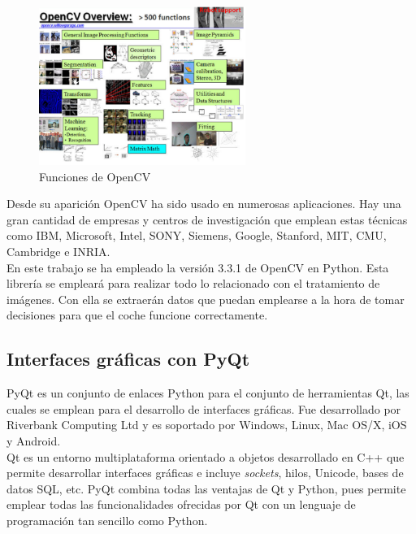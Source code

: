 \begin{figure}[H]
  \begin{center}
    \includegraphics[width=0.6\textwidth]{figures/Estado_arte/opencv.png}
		\caption{Funciones de OpenCV}
		\label{fig.opencv}
		\end{center}
\end{figure}


Desde su aparición OpenCV ha sido usado en numerosas aplicaciones. Hay una gran cantidad de empresas y centros de investigación que emplean estas técnicas como IBM, Microsoft, Intel, SONY, Siemens, Google, Stanford, MIT, CMU, Cambridge e INRIA.\\

En este trabajo se ha empleado la versión 3.3.1 de OpenCV en Python. Esta librería se empleará para realizar todo lo relacionado con el tratamiento de imágenes. Con ella se extraerán datos que puedan emplearse a la hora de tomar decisiones para que el coche funcione correctamente.


\subsection{Interfaces gráficas con PyQt}

PyQt \cite{pyqt} \cite{pyqt1} es un conjunto de enlaces Python para el conjunto de herramientas Qt, las cuales se emplean para el desarrollo de interfaces gráficas. Fue desarrollado por Riverbank Computing Ltd y es soportado por Windows, Linux, Mac OS/X, iOS y Android.\\

Qt es un entorno multiplataforma orientado a objetos desarrollado en C++ que permite desarrollar interfaces gráficas e incluye \textit{sockets}, hilos, Unicode, bases de datos SQL, etc. PyQt combina todas las ventajas de Qt y Python, pues permite emplear todas las funcionalidades ofrecidas por Qt con un lenguaje de programación tan sencillo como Python.\\

